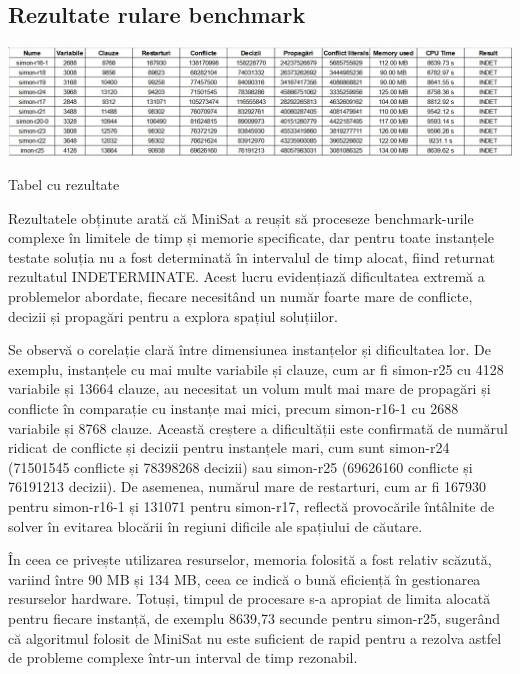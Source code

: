 \documentclass[runningheads]{llncs}
\begin{document}
 \subsection{Rezultate rulare benchmark}

 
\begin{center}
    \includegraphics[width=1.20\textwidth]{images/benchmark/tabel_rezultate.jpg}
     \caption{Tabel cu rezultate}
\end{center}
 
Rezultatele obținute arată că MiniSat a reușit să proceseze benchmark-urile complexe în limitele de timp și memorie specificate, dar pentru toate instanțele testate soluția nu a fost determinată în intervalul de timp alocat, fiind returnat rezultatul INDETERMINATE. Acest lucru evidențiază dificultatea extremă a problemelor abordate, fiecare necesitând un număr foarte mare de conflicte, decizii și propagări pentru a explora spațiul soluțiilor.

Se observă o corelație clară între dimensiunea instanțelor și dificultatea lor. De exemplu, instanțele cu mai multe variabile și clauze, cum ar fi simon-r25 cu 4128 variabile și 13664 clauze, au necesitat un volum mult mai mare de propagări și conflicte în comparație cu instanțe mai mici, precum simon-r16-1 cu 2688 variabile și 8768 clauze. Această creștere a dificultății este confirmată de numărul ridicat de conflicte și decizii pentru instanțele mari, cum sunt simon-r24 (71501545 conflicte și 78398268 decizii) sau simon-r25 (69626160 conflicte și 76191213 decizii). De asemenea, numărul mare de restarturi, cum ar fi 167930 pentru simon-r16-1 și 131071 pentru simon-r17, reflectă provocările întâlnite de solver în evitarea blocării în regiuni dificile ale spațiului de căutare.

În ceea ce privește utilizarea resurselor, memoria folosită a fost relativ scăzută, variind între 90 MB și 134 MB, ceea ce indică o bună eficiență în gestionarea resurselor hardware. Totuși, timpul de procesare s-a apropiat de limita alocată pentru fiecare instanță, de exemplu 8639,73 secunde pentru simon-r25, sugerând că algoritmul folosit de MiniSat nu este suficient de rapid pentru a rezolva astfel de probleme complexe într-un interval de timp rezonabil.
\end{document}
